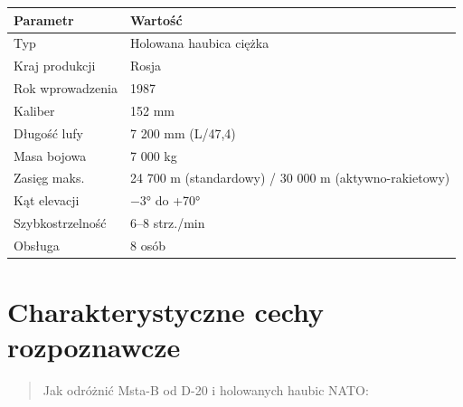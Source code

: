 \documentclass[12pt,openany,oneside]{book}
\begin{document}
\begin{longtable}[]{@{}ll@{}}
\toprule\noalign{}
Parametr & Wartość \\
\midrule\noalign{}
\endhead
\bottomrule\noalign{}
\endlastfoot
Typ & Holowana haubica ciężka \\
Kraj produkcji & Rosja \\
Rok wprowadzenia & 1987 \\
Kaliber & 152 mm \\
Długość lufy & 7 200 mm (L/47,4) \\
Masa bojowa & 7 000 kg \\
Zasięg maks. & 24 700 m (standardowy) / 30 000 m (aktywno-rakietowy) \\
Kąt elevacji & −3° do +70° \\
Szybkostrzelność & 6--8 strz./min \\
Obsługa & 8 osób \\
\end{longtable}

\section{Charakterystyczne cechy
rozpoznawcze}\label{charakterystyczne-cechy-rozpoznawcze-21}

\begin{quote}
Jak odróżnić Msta-B od D-20 i holowanych haubic NATO:
\end{quote}
\end{document}
